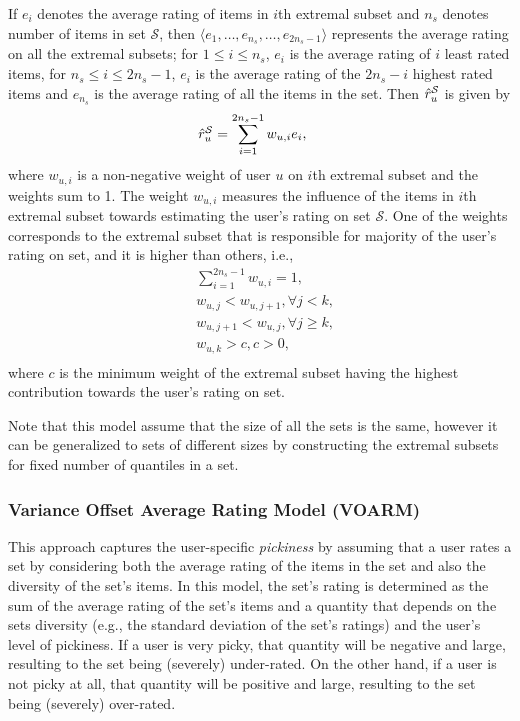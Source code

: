 If $e_i$ denotes the average rating of items in $i$th extremal
subset and $n_s$ denotes number of items in set $\mathcal{S}$, 
then $\langle e_1, \ldots, e_{n_s}, \ldots, e_{2n_s - 1} \rangle$ represents
the average rating on all the extremal subsets; for $1 \le i \le
n_s$, $e_i$ is the average rating of $i$ least rated
items, for $n_s \le i \le 2n_s - 1 $, $e_i$ is the average rating
of the $2n_s - i$ highest rated items and $e_{n_s}$ is the average rating of all
the items in the set. Then $\mbox{$\hat{r}_{u}^{\mathcal{S}}$}$ is given by
\begin{equation} \label{avgbuckacteq}
  \begin{split}
    \mbox{$\hat{r}_{u}^{\mathcal{S}}$} &= \sum_{i=1}^{2n_s - 1} w_{u,i} e_{i},
  \end{split}
\end{equation}
\noindent where $w_{u,i}$ is a non-negative weight of user $u$ on
$i$th extremal subset and the weights sum to 1.
The weight $w_{u,i}$ measures the influence of the items in $i$th extremal subset 
towards estimating the user's rating on set $\mathcal{S}$.
One of the weights corresponds to the extremal subset that is responsible for majority of the user's rating on set, and it is higher than others, i.e.,
\begin{equation} \label{esqpmodel_eq}
	\begin{aligned}  
        & \sum_{i=1}^{2n_s - 1}w_{u,i}=1,  \\
        & w_{u, j} < w_{u, j+1}, \forall j < k, \\
        & w_{u, j+1} < w_{u, j}, \forall j \ge k, \\
        & w_{u,k} > c,  c > 0, \\
     \end{aligned}
\end{equation}
\noindent where $c$ is the minimum weight of the extremal subset having the
    highest contribution towards the user's rating on set.


Note that this model assume
that the size of all the sets is the same, however it can be generalized to sets
of different sizes by constructing the extremal subsets for fixed number
of quantiles in a set.



\subsubsection*{Variance Offset Average Rating Model (VOARM)}
This approach captures the user-specific \emph{pickiness} by assuming that a user rates a set by considering both the
average rating of the items in the set
and also the diversity of the set's items. In this model, the set's rating is
determined as the sum of the average
rating of the set's items and a quantity that depends on the sets diversity
(e.g.,
the standard deviation of the set's ratings) and the user's level of
pickiness. 
If a user is very picky, that quantity will be
negative and large, resulting to the set being
(severely) under-rated. On the other hand, if a user is not picky at all, that
quantity will be positive and large, resulting to the 
set being (severely) over-rated. 

